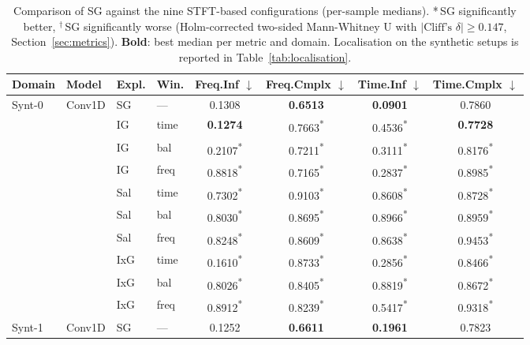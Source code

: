 \begin{landscape}
\begin{table}[p]
\centering
\caption{Comparison of SG against the nine STFT-based configurations (per-sample medians). {*}\,SG significantly better, $^\dag$\,SG significantly worse (Holm-corrected two-sided Mann-Whitney U with $|\text{Cliff's }\delta|\geq0.147$, Section~\ref{sec:metrics}). \textbf{Bold}: best median per metric and domain. Localisation on the synthetic setups is reported in Table~\ref{tab:localisation}.}
\label{tab:comparison}
\setlength{\tabcolsep}{2.5pt}
\begin{tabular}{@{}llllcccc@{}}
\toprule
\textbf{Domain} & \textbf{Model} & \textbf{Expl.} & \textbf{Win.} & \textbf{Freq.Inf} $\downarrow$ & \textbf{Freq.Cmplx} $\downarrow$ & \textbf{Time.Inf} $\downarrow$ & \textbf{Time.Cmplx} $\downarrow$ \\
\midrule
Synt-0 & Conv1D & SG & --- & 0.1308 & \textbf{0.6513} & \textbf{0.0901} & 0.7860 \\
 &  & IG & time & \textbf{0.1274} & 0.7663\textsuperscript{*} & 0.4536\textsuperscript{*} & \textbf{0.7728} \\
 &  & IG & bal & 0.2107\textsuperscript{*} & 0.7211\textsuperscript{*} & 0.3111\textsuperscript{*} & 0.8176\textsuperscript{*} \\
 &  & IG & freq & 0.8818\textsuperscript{*} & 0.7165\textsuperscript{*} & 0.2837\textsuperscript{*} & 0.8985\textsuperscript{*} \\
 &  & Sal & time & 0.7302\textsuperscript{*} & 0.9103\textsuperscript{*} & 0.8608\textsuperscript{*} & 0.8728\textsuperscript{*} \\
 &  & Sal & bal & 0.8030\textsuperscript{*} & 0.8695\textsuperscript{*} & 0.8966\textsuperscript{*} & 0.8959\textsuperscript{*} \\
 &  & Sal & freq & 0.8248\textsuperscript{*} & 0.8609\textsuperscript{*} & 0.8638\textsuperscript{*} & 0.9453\textsuperscript{*} \\
 &  & IxG & time & 0.1610\textsuperscript{*} & 0.8733\textsuperscript{*} & 0.2856\textsuperscript{*} & 0.8466\textsuperscript{*} \\
 &  & IxG & bal & 0.8026\textsuperscript{*} & 0.8405\textsuperscript{*} & 0.8819\textsuperscript{*} & 0.8672\textsuperscript{*} \\
 &  & IxG & freq & 0.8912\textsuperscript{*} & 0.8239\textsuperscript{*} & 0.5417\textsuperscript{*} & 0.9318\textsuperscript{*} \\
\midrule
Synt-1 & Conv1D & SG & --- & 0.1252 & \textbf{0.6611} & \textbf{0.1961} & 0.7823 \\

\end{tabular}
\end{table}
\end{landscape}
